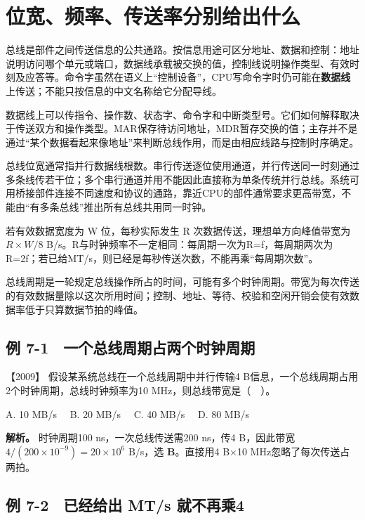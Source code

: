 \section{位宽、频率、传送率分别给出什么}\label{co-07-01}

总线是部件之间传送信息的公共通路。按信息用途可区分地址、数据和控制：地址说明访问哪个单元或端口，数据线承载被交换的值，控制线说明操作类型、有效时刻及应答等。命令字虽然在语义上``控制设备''，CPU写命令字时仍可能在\textbf{数据线}上传送；不能只按信息的中文名称给它分配导线。

数据线上可以传指令、操作数、状态字、命令字和中断类型号。它们如何解释取决于传送双方和操作类型。MAR保存待访问地址，MDR暂存交换的值；主存并不是通过``某个数据看起来像地址''来判断总线作用，而是由相应线路与控制时序确定。

总线位宽通常指并行数据线根数。串行传送逐位使用通道，并行传送同一时刻通过多条线传若干位；多个串行通道并用不能因此直接称为单条传统并行总线。系统可用桥接部件连接不同速度和协议的通路，靠近CPU的部件通常要求更高带宽，不能由``有多条总线''推出所有总线共用同一时钟。

若有效数据宽度为 W 位，每秒实际发生 R 次数据传送，理想单方向峰值带宽为 \(R\times W/8\) B/s。R与时钟频率不一定相同：每周期一次为R=f，每周期两次为R=2f；若已给MT/s，则已经是每秒传送次数，不能再乘``每周期次数''。

总线周期是一轮规定总线操作所占的时间，可能有多个时钟周期。带宽为每次传送的有效数据量除以这次所用时间；控制、地址、等待、校验和空闲开销会使有效数据率低于只算数据节拍的峰值。

\subsection{例 7-1　一个总线周期占两个时钟周期}\label{co-ex7-1}

\noindent{}【2009】 假设某系统总线在一个总线周期中并行传输4 B信息，一个总线周期占用2个时钟周期，总线时钟频率为10 MHz，则总线带宽是（　）。

A. 10 MB/s　 B. 20 MB/s　 C. 40 MB/s　 D. 80 MB/s


\textbf{解析。} 时钟周期100 ns，一次总线传送需200 ns，传4 B，因此带宽 \(4/(200\times10^{-9})=20\times10^6\) B/s，选 \textbf{B}。直接用4 B×10 MHz忽略了每次传送占两拍。

\subsection{例 7-2　已经给出 MT/s 就不再乘4}\label{co-ex7-2}


